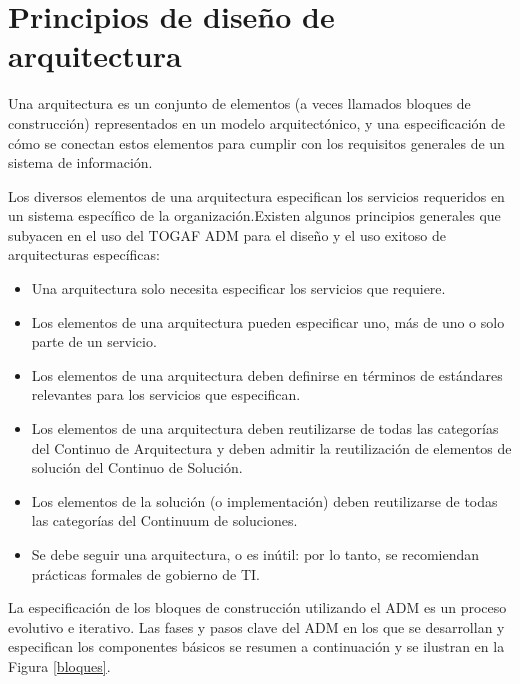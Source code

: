 \section{Principios de diseño de arquitectura}
Una arquitectura es un conjunto de elementos (a veces llamados bloques de construcción) representados en un modelo arquitectónico, y una especificación de cómo se conectan estos elementos para cumplir con los requisitos generales de un sistema de información.

Los diversos elementos de una arquitectura especifican los servicios requeridos en un sistema específico de la organización.Existen algunos principios generales que subyacen en el uso del TOGAF ADM para el diseño y el uso exitoso de arquitecturas específicas:

\begin{itemize}
\item Una arquitectura solo necesita especificar los servicios que requiere.
\item Los elementos de una arquitectura pueden especificar uno, más de uno o solo parte de un servicio.
\item Los elementos de una arquitectura deben definirse en términos de estándares relevantes para los servicios que especifican.
\item Los elementos de una arquitectura deben reutilizarse de todas las categorías del Continuo de Arquitectura y deben admitir la reutilización de elementos de solución del Continuo de Solución.
\item Los elementos de la solución (o implementación) deben reutilizarse de todas las categorías del Continuum de soluciones.
\item Se debe seguir una arquitectura, o es inútil: por lo tanto, se recomiendan prácticas formales de gobierno de TI.
\end{itemize}

La especificación de los bloques de construcción utilizando el ADM es un proceso evolutivo e iterativo. Las fases y pasos clave del ADM en los que se desarrollan y especifican los componentes básicos se resumen a continuación y se ilustran en la Figura \ref{bloques}.

